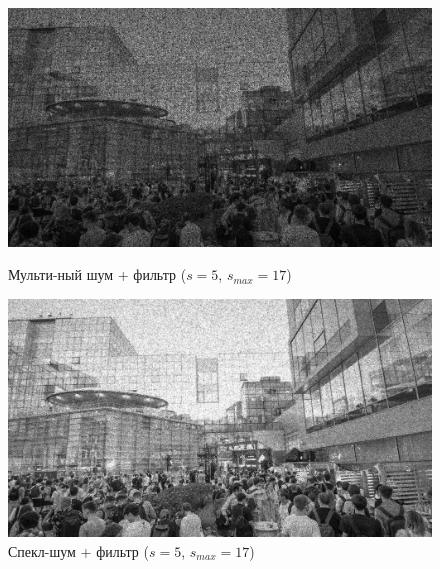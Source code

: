 \documentclass[a4paper]{article}
\begin{document}
\begin{figure}[H]
    \begin{minipage}{0.49\textwidth}
        \centering \includegraphics[width=\textwidth]{images/3_nonlinear_filters/multiplicative - adaptive median (s_start=5, s_max=17).jpg}
        \caption{Мульти-ный шум + фильтр ($s = 5$, $s_{max}=17$)}
    \end{minipage}\hfill
    \begin{minipage}{0.49\textwidth}
        \centering \includegraphics[width=\textwidth]{images/3_nonlinear_filters/speckle - adaptive median (s_start=5, s_max=17).jpg}
        \caption{Спекл-шум + фильтр ($s = 5$, $s_{max}=17$)}
    \end{minipage}
\end{figure}
\end{document}
